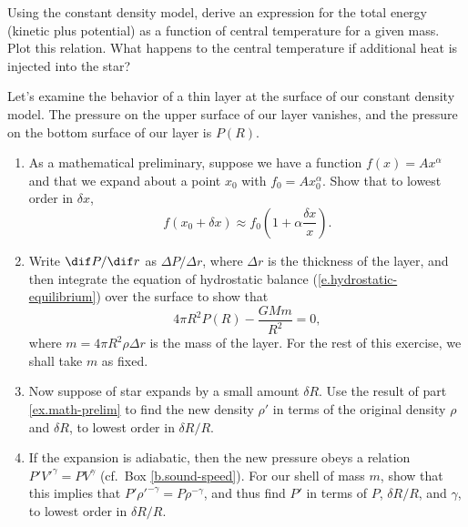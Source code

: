 \begin{exercisebox}
\label{ex.gravithermal-specific-heat}
Using the constant density model, derive an expression for the total energy (kinetic plus potential) as a function of central temperature for a given mass. Plot this relation.  What happens to the central temperature if additional heat is injected into the star?
\end{exercisebox}

\begin{exercisebox}
\label{ex.stellar-oscillation-period}
Let's examine the behavior of a thin layer at the surface of our constant density model. The pressure on the upper surface of our layer vanishes, and the pressure on the bottom surface of our layer is $P(R)$.

\begin{enumerate}
\item\label{ex.math-prelim}
As a mathematical preliminary, suppose we have a function $f(x) = Ax^{\alpha}$ and that we expand about a point $x_{0}$ with $f_{0} = Ax_{0}^{\alpha}$. Show that to lowest order in $\delta x$,
\[
	f(x_{0}+\delta x) \approx f_{0}\left( 1 + \alpha\frac{\delta x}{x} \right).
\]

\item
Write $\dif P/\dif r$ as $\Delta P/\Delta r$, where $\Delta r$ is the thickness of the layer, and then integrate the equation of hydrostatic balance (\ref{e.hydrostatic-equilibrium}) over the surface to show that
\begin{equation}\label{e.shell-pressure-balance}
	4\pi R^{2} P(R) - \frac{GMm}{R^{2}} = 0,
\end{equation}
where $m = 4\pi R^{2}\rho \Delta r$ is the mass of the layer. For the rest of this exercise, we shall take $m$ as fixed.

\item
Now suppose of star expands by a small amount $\delta R$. Use the result of part \ref{ex.math-prelim} to find the new density $\rho'$ in terms of the original density $\rho$ and $\delta R$, to lowest order in $\delta R/R$.

\item
If the expansion is adiabatic, then the new pressure obeys a relation $P' V'^{\gamma} = PV^{\gamma}$ (cf.\ Box \ref{b.sound-speed}). For our shell of mass $m$, show that this implies that $P'\rho'^{-\gamma} = P\rho^{-\gamma}$, and thus find $P'$ in terms of $P$, $\delta R/R$, and $\gamma$, to lowest order in $\delta R/R$.


\end{enumerate}
\end{exercisebox}
